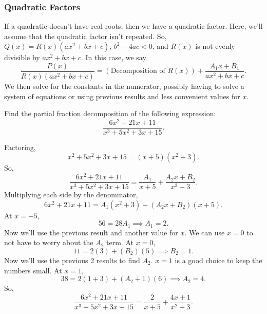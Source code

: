 \subsubsection{Quadratic Factors}
\noindent
If a quadratic doesn't have real roots, then we have a quadratic factor. Here, we'll assume that the quadratic factor isn't repeated. 
So, $Q(x) = R(x)(ax^2+bx+c)$, $b^2-4ac < 0$, and $R(x)$ is not evenly divisible by $ax^2+bx+c$.
In this case, we say
\begin{equation*}
	\frac{P(x)}{R(x)(ax^2+bx+c)} = \left(\text{Decomposition of }R(x)\right)+\frac{A_1x+B_1}{ax^2+bx+c}.
\end{equation*}
We then solve for the constants in the numerator, possibly having to solve a system of equations or using previous results and less convenient values for $x$.

\begin{example}
	Find the partial fraction decomposition of the following expression:
	\begin{equation*}
		\frac{6x^2+21x+11}{x^3+5x^2+3x+15}.
	\end{equation*}
\end{example}
\noindent
Factoring,
\begin{equation*}
	x^2+5x^2+3x+15 = (x+5)(x^2+3).
\end{equation*}
So,
\begin{equation*}
	\frac{6x^2+21x+11}{x^3+5x^2+3x+15} = \frac{A_1}{x+5}+\frac{A_2x+B_2}{x^2+3}.
\end{equation*}
Multiplying each side by the denominator,
\begin{equation*}
	6x^2+21x+11 = A_1(x^2+3)+(A_2x+B_2)(x+5).
\end{equation*}
At $x=-5$,
\begin{equation*}
	56 = 28A_1 \implies A_1 = 2.
\end{equation*}
Now we'll use the previous result and another value for $x$. We can use $x=0$ to not have to worry about the $A_2$ term.
At $x=0$,
\begin{equation*}
	11 = 2(3) + (B_2)(5) \implies B_2 = 1.
\end{equation*}
Now we'll use the previous 2 results to find $A_2$. $x=1$ is a good choice to keep the numbers small.
At $x=1$,
\begin{equation*}
	38 = 2(1+3)+(A_2+1)(6) \implies A_2 = 4.
\end{equation*}
So,
\begin{equation*}
	\frac{6x^2+21x+11}{x^3+5x^2+3x+15} = \frac{2}{x+5}+\frac{4x+1}{x^2+3}.
\end{equation*}
